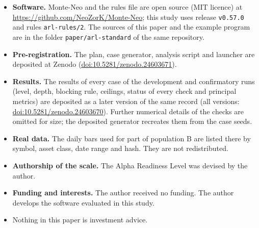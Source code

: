 \documentclass[11pt]{article}
\begin{document}
\begin{itemize}
\item \textbf{Software.} Monte-Neo and the rules file are open source (MIT licence) at
\url{https://github.com/NeoZorK/Monte-Neo}; this study uses release \texttt{v0.57.0} and rules \texttt{arl-rules/2}. The
sources of this paper and the example program are in the folder \texttt{paper/arl-standard} of the same repository.
\item \textbf{Pre-registration.} The plan, case generator, analysis script and launcher are deposited at Zenodo
(\href{https://doi.org/10.5281/zenodo.24603671}{doi:10.5281/zenodo.24603671}).
\item \textbf{Results.} The results of every case of the development and confirmatory runs (level, depth, blocking rule,
ceilings, status of every check and principal metrics) are deposited as a later version of the same record (all
versions: \href{https://doi.org/10.5281/zenodo.24603670}{doi:10.5281/zenodo.24603670}). Further numerical details of the
checks are omitted for size; the deposited generator recreates them from the case seeds.
\item \textbf{Real data.} The daily bars used for part of population B are listed there by symbol, asset class, date
range and hash. They are not redistributed.
\item \textbf{Authorship of the scale.} The Alpha Readiness Level was devised by the author.
\item \textbf{Funding and interests.} The author received no funding. The author develops the software evaluated in this
study.
\item Nothing in this paper is investment advice.
\end{itemize}
\end{document}

